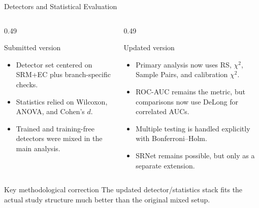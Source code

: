 \documentclass[aspectratio=169,11pt]{beamer}
\begin{document}
\begin{frame}{Detectors and Statistical Evaluation}
\footnotesize
\begin{columns}[T]
\begin{column}{0.49\textwidth}
\begin{block}{Submitted version}
\begin{itemize}
\item Detector set centered on SRM+EC plus branch-specific checks.
\item Statistics relied on Wilcoxon, ANOVA, and Cohen's $d$.
\item Trained and training-free detectors were mixed in the main analysis.
\end{itemize}
\end{block}
\end{column}
\begin{column}{0.49\textwidth}
\begin{exampleblock}{Updated version}
\begin{itemize}
\item Primary analysis now uses RS, $\chi^2$, Sample Pairs, and calibration $\chi^2$.
\item ROC-AUC remains the metric, but comparisons now use DeLong for correlated AUCs.
\item Multiple testing is handled explicitly with Bonferroni--Holm.
\item SRNet remains possible, but only as a separate extension.
\end{itemize}
\end{exampleblock}
\end{column}
\end{columns}

\vspace{0.05cm}
\begin{alertblock}{Key methodological correction}
The updated detector/statistics stack fits the actual study structure much better than the original mixed setup.
\end{alertblock}
\end{frame}
\end{document}
